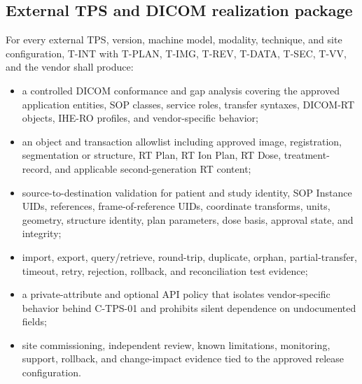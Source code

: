 \documentclass[11pt,letterpaper]{article}
\begin{document}
\subsection{External TPS and DICOM realization package}
For every external TPS, version, machine model, modality, technique, and site configuration, T-INT with T-PLAN, T-IMG, T-REV, T-DATA, T-SEC, T-VV, and the vendor shall produce:
\begin{itemize}
\item a controlled DICOM conformance and gap analysis covering the approved application entities, SOP classes, service roles, transfer syntaxes, DICOM-RT objects, IHE-RO profiles, and vendor-specific behavior;
\item an object and transaction allowlist including approved image, registration, segmentation or structure, RT Plan, RT Ion Plan, RT Dose, treatment-record, and applicable second-generation RT content;
\item source-to-destination validation for patient and study identity, SOP Instance UIDs, references, frame-of-reference UIDs, coordinate transforms, units, geometry, structure identity, plan parameters, dose basis, approval state, and integrity;
\item import, export, query/retrieve, round-trip, duplicate, orphan, partial-transfer, timeout, retry, rejection, rollback, and reconciliation test evidence;
\item a private-attribute and optional API policy that isolates vendor-specific behavior behind C-TPS-01 and prohibits silent dependence on undocumented fields;
\item site commissioning, independent review, known limitations, monitoring, support, rollback, and change-impact evidence tied to the approved release configuration.
\end{itemize}
\end{document}

